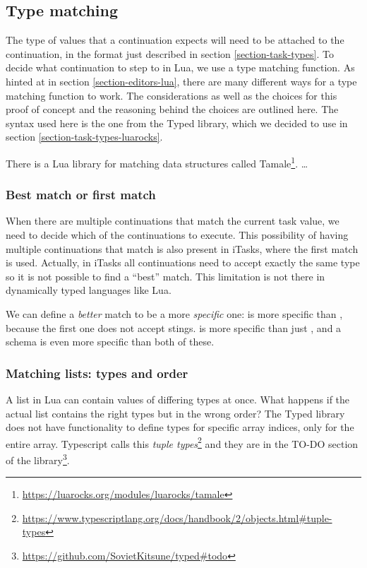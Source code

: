 \subsection{Type matching}\label{section-combinators-type-matching}
The type of values that a continuation expects will need to be attached to the continuation, in the format just described in section \ref{section-task-types}. To decide what continuation to step to in Lua, we use a type matching function. As hinted at in section \ref{section-editors-lua}, there are many different ways for a type matching function to work. The considerations as well as the choices for this proof of concept and the reasoning behind the choices are outlined here. The syntax used here is the one from the Typed library, which we decided to use in section \ref{section-task-types-luarocks}.

There is a Lua library for matching data structures called Tamale\footnote{\url{https://luarocks.org/modules/luarocks/tamale}}. \dots{}

\subsubsection{Best match or first match}
When there are multiple continuations that match the current task value, we need to decide which of the continuations to execute. This possibility of having multiple continuations that match is also present in iTasks, where the first match is used. Actually, in iTasks all continuations need to accept exactly the same type so it is not possible to find a ``best'' match. This limitation is not there in dynamically typed languages like Lua.

We can define a \textit{better} match to be a more \textit{specific} one:  is more specific than , because the first one does not accept stings.  is more specific than just , and a schema  is even more specific than both of these.

\subsubsection{Matching lists: types and order}
A list in Lua can contain values of differing types at once. What happens if the actual list contains the right types but in the wrong order? The Typed library does not have functionality to define types for specific array indices, only for the entire array. Typescript calls this \textit{tuple types}\footnote{\label{footnote-typescript-tuple-types}\url{https://www.typescriptlang.org/docs/handbook/2/objects.html#tuple-types}} and they are in the TO-DO section of the library\footnote{\url{https://github.com/SovietKitsune/typed#todo}}.

